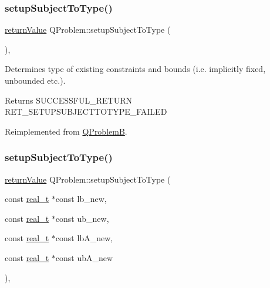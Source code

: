 \subsubsection{\texorpdfstring{setup\+Subject\+To\+Type()}{setupSubjectToType()}\hspace{0.1cm}{\footnotesize\ttfamily [1/2]}}
{\footnotesize\ttfamily \hyperlink{_message_handling_8hpp_a81d556f613bfbabd0b1f9488c0fa865e}{return\+Value} Q\+Problem\+::setup\+Subject\+To\+Type (\begin{DoxyParamCaption}{ }\end{DoxyParamCaption})\hspace{0.3cm}{\ttfamily [protected]}, {\ttfamily [virtual]}}

Determines type of existing constraints and bounds (i.\+e. implicitly fixed, unbounded etc.). \begin{DoxyReturn}{Returns}
S\+U\+C\+C\+E\+S\+S\+F\+U\+L\+\_\+\+R\+E\+T\+U\+RN ~\newline
 R\+E\+T\+\_\+\+S\+E\+T\+U\+P\+S\+U\+B\+J\+E\+C\+T\+T\+O\+T\+Y\+P\+E\+\_\+\+F\+A\+I\+L\+ED 
\end{DoxyReturn}


Reimplemented from \hyperlink{class_q_problem_b_a4aa7da7c8454c0e53e65f923cd5c6e21}{Q\+ProblemB}.

\mbox{\label{class_q_problem_a2b526270858f09361f3a523124a0f0ba}} 
\subsubsection{\texorpdfstring{setup\+Subject\+To\+Type()}{setupSubjectToType()}\hspace{0.1cm}{\footnotesize\ttfamily [2/2]}}
{\footnotesize\ttfamily \hyperlink{_message_handling_8hpp_a81d556f613bfbabd0b1f9488c0fa865e}{return\+Value} Q\+Problem\+::setup\+Subject\+To\+Type (\begin{DoxyParamCaption}\item[{const \hyperlink{qp_o_a_s_e_s__wrapper_8h_a0d00e2b3dfadee81331bbb39068570c4}{real\+\_\+t} $\ast$const}]{lb\+\_\+new,  }\item[{const \hyperlink{qp_o_a_s_e_s__wrapper_8h_a0d00e2b3dfadee81331bbb39068570c4}{real\+\_\+t} $\ast$const}]{ub\+\_\+new,  }\item[{const \hyperlink{qp_o_a_s_e_s__wrapper_8h_a0d00e2b3dfadee81331bbb39068570c4}{real\+\_\+t} $\ast$const}]{lb\+A\+\_\+new,  }\item[{const \hyperlink{qp_o_a_s_e_s__wrapper_8h_a0d00e2b3dfadee81331bbb39068570c4}{real\+\_\+t} $\ast$const}]{ub\+A\+\_\+new }\end{DoxyParamCaption})\hspace{0.3cm}{\ttfamily [protected]}, {\ttfamily [virtual]}}


